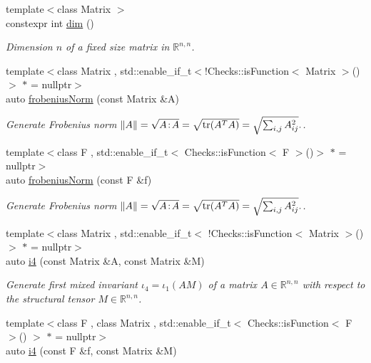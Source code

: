 \begin{DoxyCompactItemize}
{\footnotesize template$<$class Matrix $>$ }\\constexpr int \hyperlink{namespacefuncy_1_1LinearAlgebra_a9a0c9eebca2ecfd137b88321a0f866b7}{dim} ()
\begin{DoxyCompactList}\small\item\em Dimension $n$ of a fixed size matrix in $\mathbb{R}^{n,n}$. \end{DoxyCompactList}\item 
{\footnotesize template$<$class Matrix , std\-::enable\-\_\-if\-\_\-t$<$!\-Checks\-::is\-Function$<$ Matrix $>$()$>$ $\ast$  = nullptr$>$ }\\auto \hyperlink{group__LinearAlgebraGroup_gadd3d66efe1da1c662ef080bfe25fa2b6}{frobenius\-Norm} (const Matrix \&A)
\begin{DoxyCompactList}\small\item\em Generate Frobenius norm $ \|A\| = \sqrt{A\negthinspace : \negthinspace A }= \sqrt{\mathrm{tr}(A^TA)} = \sqrt{\sum_{i,j} A_{ij}^2}. $. \end{DoxyCompactList}\item 
{\footnotesize template$<$class F , std\-::enable\-\_\-if\-\_\-t$<$ Checks\-::is\-Function$<$ F $>$()$>$ $\ast$  = nullptr$>$ }\\auto \hyperlink{group__LinearAlgebraGroup_ga65a04179c8ede922ff74470f7ad15a8d}{frobenius\-Norm} (const F \&f)
\begin{DoxyCompactList}\small\item\em Generate Frobenius norm $ \|A\| = \sqrt{A\negthinspace : \negthinspace A }= \sqrt{\mathrm{tr}(A^TA)} = \sqrt{\sum_{i,j} A_{ij}^2}. $. \end{DoxyCompactList}\item 
{\footnotesize template$<$class Matrix , std\-::enable\-\_\-if\-\_\-t$<$ !\-Checks\-::is\-Function$<$ Matrix $>$() $>$ $\ast$  = nullptr$>$ }\\auto \hyperlink{group__InvariantGroup_gaab35bf5d54bc45e68d89fbf81392a26d}{i4} (const Matrix \&A, const Matrix \&M)
\begin{DoxyCompactList}\small\item\em Generate first mixed invariant $ \iota_4=\iota_1(AM) $ of a matrix $A\in\mathbb{R}^{n,n}$ with respect to the structural tensor $M\in\mathbb{R}^{n,n}$. \end{DoxyCompactList}\item 
{\footnotesize template$<$class F , class Matrix , std\-::enable\-\_\-if\-\_\-t$<$ Checks\-::is\-Function$<$ F $>$() $>$ $\ast$  = nullptr$>$ }\\auto \hyperlink{group__InvariantGroup_ga7b1a9eb02b3d406bc2e5e5159045d439}{i4} (const F \&f, const Matrix \&M)

\end{DoxyCompactItemize}
